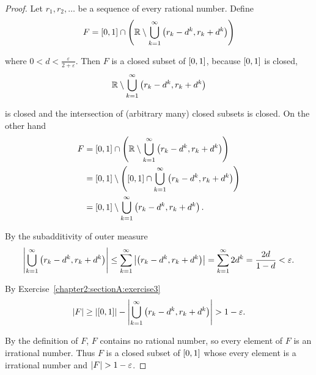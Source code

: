 \begin{proof}
    Let $r_{1}, r_{2}, \ldots$ be a sequence of every rational number. Define
    \[
        F = \left[{0, 1}\right]\cap \left(\mathbb{R} \setminus \bigcup^{\infty}_{k=1}\left({r_{k} - d^{k}, r_{k} + d^{k}}\right)\right)
    \]

    where $0 < d < \frac{\varepsilon}{2 + \varepsilon}$. Then $F$ is a closed subset of $\left[{0, 1}\right]$, because $\left[{0, 1}\right]$ is closed,
    \[
        \mathbb{R} \setminus \bigcup^{\infty}_{k=1}\left({r_{k} - d^{k}, r_{k} + d^{k}}\right)
    \]

    is closed and the intersection of (arbitrary many) closed subsets is closed. On the other hand
    \begin{align*}
        F & = \left[{0, 1}\right]\cap \left(\mathbb{R} \setminus \bigcup^{\infty}_{k=1}\left({r_{k} - d^{k}, r_{k} + d^{k}}\right)\right)           \\
          & = \left[{0, 1}\right]\setminus \left(\left[{0, 1}\right]\cap \bigcup^{\infty}_{k=1}\left({r_{k} - d^{k}, r_{k} + d^{k}}\right)\right) \\
          & = \left[{0, 1}\right]\setminus \bigcup^{\infty}_{k=1}\left({r_{k} - d^{k}, r_{k} + d^{k}}\right).
    \end{align*}

    By the subadditivity of outer measure
    \[
        \left\vert{\bigcup^{\infty}_{k=1}\left({r_{k} - d^{k}, r_{k} + d^{k}}\right)}\right\vert \leq \sum^{\infty}_{k=1}\left\vert{\left({r_{k} - d^{k}, r_{k} + d^{k}}\right)}\right\vert = \sum^{\infty}_{k=1}2d^{k} = \frac{2d}{1 - d} < \varepsilon.
    \]

    By Exercise~\ref{chapter2:sectionA:exercise3}
    \[
        \left\vert{F}\right\vert \geq \left\vert{\left[{0, 1}\right]}\right\vert - \left\vert{\bigcup^{\infty}_{k=1}\left({r_{k} - d^{k}, r_{k} + d^{k}}\right)}\right\vert > 1 - \varepsilon.
    \]

    By the definition of $F$, $F$ contains no rational number, so every element of $F$ is an irrational number. Thus $F$ is a closed subset of $\left[{0, 1}\right]$ whose every element is a irrational number and $\left\vert{F}\right\vert > 1 - \varepsilon$.
\end{proof}
\newpage

